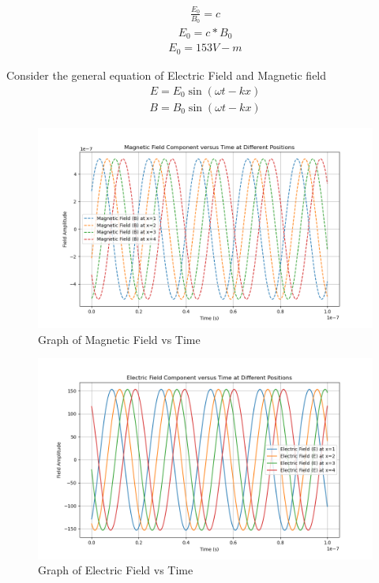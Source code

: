 \documentclass[journal,12pt,twocolumn]{IEEEtran}
\theoremstyle{remark}
\begin{document}
 \begin{align}\frac{E_0}{B_0}=c\end{align}
 \begin{align}
     E_0=c*B_0
 \end{align}
 \begin{align}E_0=153V-m\end{align}
 
Consider the general equation of Electric Field and Magnetic field
\begin{align}
    E=E_0\sin(\omega t-kx)
\end{align}
\begin{align}
    B=B_0\sin(\omega t-kx)
\end{align}
\begin{figure}[h]
    \centering
    \includegraphics[width=\linewidth]{figs/analog1.png}
    \caption{Graph of Magnetic Field vs Time}
\end{figure}
\begin{figure}[h]
    \centering
    \includegraphics[width=\linewidth]{figs/analog2.png}
    \caption{Graph of Electric Field vs Time}
\end{figure}
\end{document}
